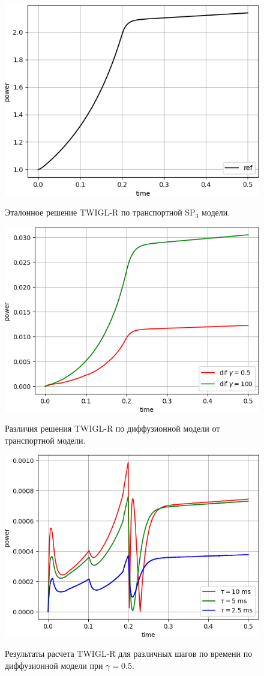 \documentclass{crm-article}
\begin{document}
\begin{figure}[ht]
\begin{center}
	\includegraphics[width=0.5\linewidth]{sp3_ref_r.png}\\
	\caption{\label{image:canonsummary} Эталонное решение TWIGL-R по транспортной SP$_3$ модели.}
	\label{ris:sp3_ref_r}
\end{center}
\end{figure}

\begin{figure}[ht]
\begin{center}
	\includegraphics[width=0.5\linewidth]{odds_r.png}\\
	\caption{\label{image:canonsummary} Различия решения TWIGL-R по диффузионной модели от транспортной модели.}
	\label{ris:odds_r}
\end{center}
\end{figure}

\begin{figure}[ht]
\begin{center}
	\includegraphics[width=0.5\linewidth]{dif_tau_r.png}\\
	\caption{\label{image:canonsummary}Результаты расчета TWIGL-R для различных шагов по времени по диффузионной модели при $\gamma=0.5$.}
	\label{ris:dif_tau_r_0.5}
\end{center}
\end{figure}
\end{document}

